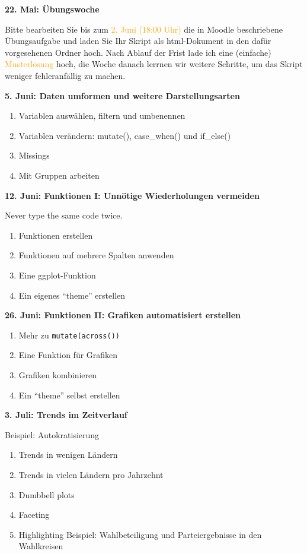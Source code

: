 \documentclass[11pt,]{scrartcl}
\providecommand{\tightlist}{%
   \setlength{\itemsep}{0pt}\setlength{\parskip}{0pt}}
\begin{document}
\textbf{22. Mai: Übungswoche}

Bitte bearbeiten Sie bis zum \textcolor{Orange}{2. Juni (18:00 Uhr)} die
in Moodle beschriebene Übungsaufgabe und laden Sie Ihr Skript als
html-Dokument in den dafür vorgesehenen Ordner hoch. Nach Ablauf der
Frist lade ich eine (einfache) \textcolor{Orange}{Musterlösung} hoch,
die Woche danach lerrnen wir weitere Schritte, um das Skript weniger
fehleranfällig zu machen.

\textbf{5. Juni: Daten umformen und weitere Darstellungsarten}

\begin{enumerate}
\def\labelenumi{\alph{enumi})}
\tightlist
\item
  Variablen auswählen, filtern und umbenennen
\item
  Variablen verändern: mutate(), case\_when() und if\_else()
\item
  Missings
\item
  Mit Gruppen arbeiten
\end{enumerate}

\textbf{12. Juni: Funktionen I: Unnötige Wiederholungen vermeiden}

Never type the same code twice.

\begin{enumerate}
\def\labelenumi{\alph{enumi})}
\tightlist
\item
  Funktionen erstellen
\item
  Funktionen auf mehrere Spalten anwenden
\item
  Eine ggplot-Funktion
\item
  Ein eigenes ``theme'' erstellen
\end{enumerate}

\textbf{26. Juni: Funktionen II: Grafiken automatisiert erstellen}

\begin{enumerate}
\def\labelenumi{\alph{enumi})}
\tightlist
\item
  Mehr zu \texttt{mutate(across())}
\item
  Eine Funktion für Grafiken
\item
  Grafiken kombinieren
\item
  Ein ``theme'' selbst erstellen
\end{enumerate}

\textbf{3. Juli: Trends im Zeitverlauf}

Beispiel: Autokratisierung

\begin{enumerate}
\def\labelenumi{\alph{enumi})}
\tightlist
\item
  Trends in wenigen Ländern
\item
  Trends in vielen Ländern pro Jahrzehnt
\item
  Dumbbell plots
\item
  Faceting
\item
  Highlighting Beispiel: Wahlbeteiligung und Parteiergebnisse in den
  Wahlkreisen
\end{enumerate}
\end{document}
